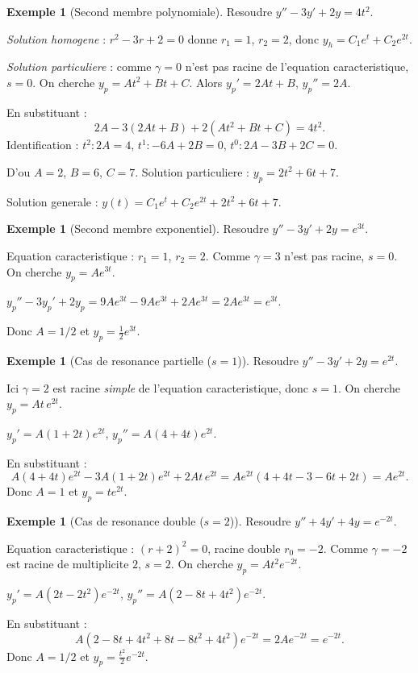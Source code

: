 \documentclass[12pt,a4paper,openany]{book}
\theoremstyle{definition}
\newtheorem{exemple}[definition]{Exemple}
\theoremstyle{plain}
\theoremstyle{remark}
\begin{document}
\begin{exemple}[Second membre polynomiale]\label{ex:sp-polynome}
Resoudre $y'' - 3y' + 2y = 4t^2$.

\emph{Solution homogene} : $r^2 - 3r + 2 = 0$ donne $r_1 = 1$, $r_2 = 2$, donc $y_h = C_1 e^t + C_2 e^{2t}$.

\emph{Solution particuliere} : comme $\gamma = 0$ n'est pas racine de l'equation caracteristique, $s = 0$. On cherche $y_p = At^2 + Bt + C$. Alors $y_p' = 2At + B$, $y_p'' = 2A$.

En substituant :
\[
  2A - 3(2At + B) + 2(At^2 + Bt + C) = 4t^2.
\]
Identification : $t^2 : 2A = 4$, $t^1 : -6A + 2B = 0$, $t^0 : 2A - 3B + 2C = 0$.

D'ou $A = 2$, $B = 6$, $C = 7$. Solution particuliere : $y_p = 2t^2 + 6t + 7$.

Solution generale : $y(t) = C_1 e^t + C_2 e^{2t} + 2t^2 + 6t + 7$.
\end{exemple}

\begin{exemple}[Second membre exponentiel]\label{ex:sp-exp}
Resoudre $y'' - 3y' + 2y = e^{3t}$.

Equation caracteristique : $r_1 = 1$, $r_2 = 2$. Comme $\gamma = 3$ n'est pas racine, $s = 0$. On cherche $y_p = Ae^{3t}$.

$y_p'' - 3y_p' + 2y_p = 9Ae^{3t} - 9Ae^{3t} + 2Ae^{3t} = 2Ae^{3t} = e^{3t}$.

Donc $A = 1/2$ et $y_p = \frac{1}{2}e^{3t}$.
\end{exemple}

\begin{exemple}[Cas de resonance partielle ($s = 1$)]\label{ex:sp-resonance}
Resoudre $y'' - 3y' + 2y = e^{2t}$.

Ici $\gamma = 2$ est racine \emph{simple} de l'equation caracteristique, donc $s = 1$. On cherche $y_p = At\, e^{2t}$.

$y_p' = A(1 + 2t)e^{2t}$, $y_p'' = A(4 + 4t)e^{2t}$.

En substituant :
\[
  A(4 + 4t)e^{2t} - 3A(1 + 2t)e^{2t} + 2At\, e^{2t} = Ae^{2t}(4 + 4t - 3 - 6t + 2t) = Ae^{2t}.
\]
Donc $A = 1$ et $y_p = te^{2t}$.
\end{exemple}

\begin{exemple}[Cas de resonance double ($s = 2$)]\label{ex:sp-resonance-double}
Resoudre $y'' + 4y' + 4y = e^{-2t}$.

Equation caracteristique : $(r+2)^2 = 0$, racine double $r_0 = -2$. Comme $\gamma = -2$ est racine de multiplicite $2$, $s = 2$. On cherche $y_p = At^2 e^{-2t}$.

$y_p' = A(2t - 2t^2)e^{-2t}$, $y_p'' = A(2 - 8t + 4t^2)e^{-2t}$.

En substituant :
\[
  A(2 - 8t + 4t^2 + 8t - 8t^2 + 4t^2)e^{-2t} = 2Ae^{-2t} = e^{-2t}.
\]
Donc $A = 1/2$ et $y_p = \frac{t^2}{2}e^{-2t}$.
\end{exemple}
\end{document}
